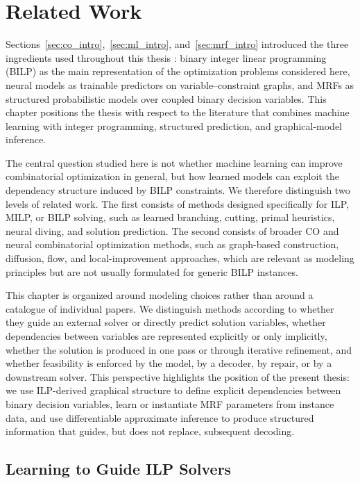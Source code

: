 \chapter{Related Work}\label{chap:chapter_2_related_work}

Sections~\ref{sec:co_intro},~\ref{sec:ml_intro}, and~\ref{sec:mrf_intro} introduced the three ingredients used throughout this thesis : binary integer linear programming (BILP) as the main representation of the optimization problems considered here, neural models as trainable predictors on variable--constraint graphs, and MRFs as structured probabilistic models over coupled binary decision variables. This chapter positions the thesis with respect to the literature that combines machine learning with integer programming, structured prediction, and graphical-model inference.

The central question studied here is not whether machine learning can improve combinatorial optimization in general, but how learned models can exploit the dependency structure induced by BILP constraints. We therefore distinguish two levels of related work. The first consists of methods designed specifically for ILP, MILP, or BILP solving, such as learned branching, cutting, primal heuristics, neural diving, and solution prediction. The second consists of broader CO and neural combinatorial optimization methods, such as graph-based construction, diffusion, flow, and local-improvement approaches, which are relevant as modeling principles but are not usually formulated for generic BILP instances.

This chapter is organized around modeling choices rather than around a catalogue of individual papers. We distinguish methods according to whether they guide an external solver or directly predict solution variables, whether dependencies between variables are represented explicitly or only implicitly, whether the solution is produced in one pass or through iterative refinement, and whether feasibility is enforced by the model, by a decoder, by repair, or by a downstream solver. This perspective highlights the position of the present thesis: we use ILP-derived graphical structure to define explicit dependencies between binary decision variables, learn or instantiate MRF parameters from instance data, and use differentiable approximate inference to produce structured information that guides, but does not replace, subsequent decoding.

\section{Learning to Guide ILP Solvers}
\label{sec:rw_solver_guidance}

